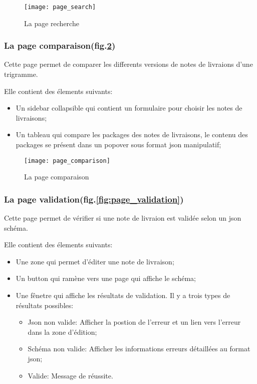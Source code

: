 \begin{figure}[ht]
 \centering
 \texttt{[image: page\_search]}
 \caption{La page recherche}
 \label{fig:page_search}
\end{figure}

\subsubsection{La page comparaison(fig.\ref{fig:page_comparaison})}
Cette page permet de comparer les differents versions de notes de livraions d'une trigramme.

Elle contient des élements suivants:
\begin{itemize}
 \item Un sidebar collapsible qui contient un formulaire pour choisir les notes de livraisons;
 \item Un tableau qui compare les packages des notes de livraisons, le contenu des packages se présent dans un popover sous format json manipulatif;
\end{itemize}

\begin{figure}[ht]
 \centering
 \texttt{[image: page\_comparison]}
 \caption{La page comparaison}
 \label{fig:page_comparaison}
\end{figure}

\subsubsection{La page validation(fig.\ref{fig:page_validation})}
Cette page permet de vérifier si une note de livraion est validée selon un json schéma.

Elle contient des élements suivants:
\begin{itemize}
 \item Une zone qui permet d'éditer une note de livraison;
 \item Un button qui ramène vers une page qui affiche le schéma;
 \item Une fênetre qui affiche les résultats de validation. Il y a trois types de résultats possibles:
       \begin{itemize}
        \item Json non valide: Afficher la postion de l'erreur et un lien vers l'erreur dans la zone d'édition;
        \item Schéma non valide: Afficher les informations erreurs détaillées au format json;
        \item Valide: Message de réussite.
       \end{itemize}
\end{itemize}

